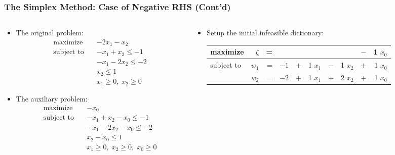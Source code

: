 \documentclass[usenames,dvipsnames,8pt]{beamer}%
\begin{document}
\begin{frame}
  \frametitle{The Simplex Method: Case of Negative RHS (Cont'd)}
  \begin{columns}
    \begin{column}{0.45\textwidth}
      \begin{itemize}
        \item The original problem:
          \begin{align*}
            \text{maximize}\quad    &-2 x_1 - x_2\\
            \text{subject to}\quad  &-x_1 + x_2 \leqslant -1\\
                                    &-x_1 - 2 x_2 \leqslant -2\\
                                    &x_2 \leqslant 1\\
                                    &x_1\geqslant 0,\;x_2\geqslant 0
          \end{align*}
        \item The auxiliary problem:
          \begin{align*}
            \text{maximize}\quad    &-x_0\\
            \text{subject to}\quad  &-x_1 + x_2 - x_0\leqslant -1\\
                                    &-x_1 - 2 x_2 - x_0 \leqslant -2\\
                                    &x_2 - x_0\leqslant 1\\
                                    &x_1\geqslant 0,\;x_2\geqslant 0,\;x_0\geqslant 0
          \end{align*}
      \end{itemize}
    \end{column}
    \begin{column}{0.55\textwidth}
      \begin{itemize}
        \item Setup the initial infeasible dictionary:
          \vspace{0.1cm}
          \begin{table}[ht]
            \centering
            \setlength\tabcolsep{2pt}
            \begin{tabular}{lrrrcrcrcr}
              \toprule
              maximize   &$\zeta$& = &   &  &  &  & & $-$ & 1 $x_0$ \\
              \midrule
              subject to & $w_1$ & = & $-1$ & $+$ & 1 $x_1$ & $-$ & 1 $x_2$ & $+$ & 1 $x_0$ \\
                         & \cellcolor{C2}\color{white}$w_2$ & = & $-2$ & $+$ & 1 $x_1$ & $+$ & 2 $x_2$ & $+$ & 1 $x_0$\\

\end{tabular}
\end{table}
\end{itemize}
\end{column}
\end{columns}
\end{frame}
\end{document}
